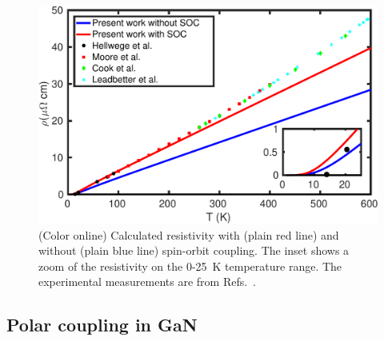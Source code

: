 \documentclass[final,3p,times,twocolumn]{elsarticle}
\begin{document}
\begin{figure}[t!]
  \centering
  \includegraphics[width=0.99\linewidth]{Pb_resistivity2.pdf}
  \caption{\label{resistivity-Pb} (Color online) Calculated resistivity with (plain red line) and without (plain blue line) spin-orbit coupling. The inset shows a zoom of the resistivity on the 0-25~K temperature range. The experimental measurements are from Refs.~\cite{Leadbetter1966,Moore1973,Cook1974,Hellwege1983}.  }
\end{figure}






\subsection{Polar coupling in GaN}
\end{document}
